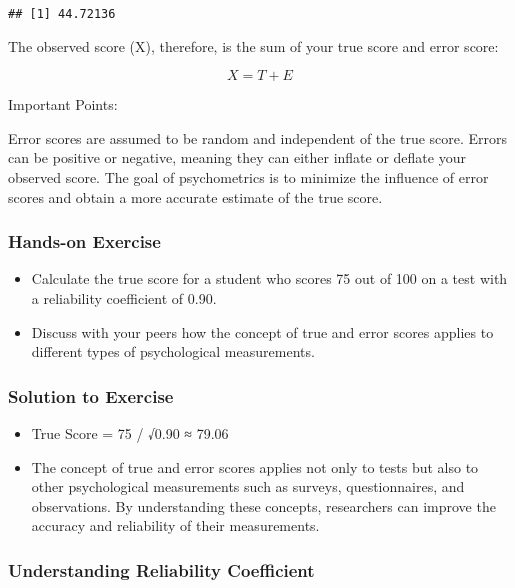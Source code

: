 \documentclass[
]{article}
\providecommand{\tightlist}{%
  \setlength{\itemsep}{0pt}\setlength{\parskip}{0pt}}
\begin{document}
\begin{verbatim}
## [1] 44.72136
\end{verbatim}

The observed score (X), therefore, is the sum of your true score and
error score:

\[ X = T + E \]

Important Points:

Error scores are assumed to be random and independent of the true score.
Errors can be positive or negative, meaning they can either inflate or
deflate your observed score. The goal of psychometrics is to minimize
the influence of error scores and obtain a more accurate estimate of the
true score.

\hypertarget{hands-on-exercise}{%
\subsubsection{Hands-on Exercise}\label{hands-on-exercise}}

\begin{itemize}
\tightlist
\item
  Calculate the true score for a student who scores 75 out of 100 on a
  test with a reliability coefficient of 0.90.
\item
  Discuss with your peers how the concept of true and error scores
  applies to different types of psychological measurements.
\end{itemize}

\hypertarget{solution-to-exercise}{%
\subsubsection{Solution to Exercise}\label{solution-to-exercise}}

\begin{itemize}
\tightlist
\item
  True Score = 75 / √0.90 ≈ 79.06
\item
  The concept of true and error scores applies not only to tests but
  also to other psychological measurements such as surveys,
  questionnaires, and observations. By understanding these concepts,
  researchers can improve the accuracy and reliability of their
  measurements.
\end{itemize}

\hypertarget{understanding-reliability-coefficient}{%
\subsubsection{Understanding Reliability
Coefficient}\label{understanding-reliability-coefficient}}
\end{document}
